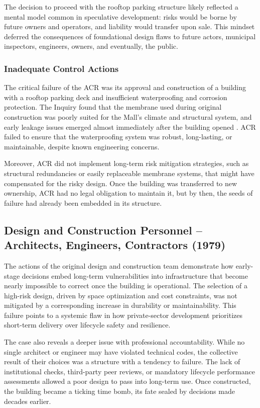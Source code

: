 \documentclass[12pt]{article}
\begin{document}
The decision to proceed with the rooftop parking structure likely reflected a mental model common in speculative development: risks would be borne by future owners and operators, and liability would transfer upon sale. This mindset deferred the consequences of foundational design flaws to future actors, municipal inspectors, engineers, owners, and eventually, the public.

\subsubsection*{Inadequate Control Actions}

The critical failure of the ACR was its approval and construction of a building with a rooftop parking deck and insufficient waterproofing and corrosion protection. The Inquiry found that the membrane used during original construction was poorly suited for the Mall’s climate and structural system, and early leakage issues emerged almost immediately after the building opened \cite[p68]{AlgoLakeReport1}. ACR failed to ensure that the waterproofing system was robust, long-lasting, or maintainable, despite known engineering concerns.

Moreover, ACR did not implement long-term risk mitigation strategies, such as structural redundancies or easily replaceable membrane systems, that might have compensated for the risky design. Once the building was transferred to new ownership, ACR had no legal obligation to maintain it, but by then, the seeds of failure had already been embedded in its structure.

\subsection{Design and Construction Personnel – Architects, Engineers, Contractors (1979)}
The actions of the original design and construction team demonstrate how early-stage decisions embed long-term vulnerabilities into infrastructure that become nearly impossible to correct once the building is operational. The selection of a high-risk design, driven by space optimization and cost constraints, was not mitigated by a corresponding increase in durability or maintainability. This failure points to a systemic flaw in how private-sector development prioritizes short-term delivery over lifecycle safety and resilience.

The case also reveals a deeper issue with professional accountability. While no single architect or engineer may have violated technical codes, the collective result of their choices was a structure with a tendency to failure. The lack of institutional checks, third-party peer reviews, or mandatory lifecycle performance assessments allowed a poor design to pass into long-term use. Once constructed, the building became a ticking time bomb, its fate sealed by decisions made decades earlier.
\end{document}
